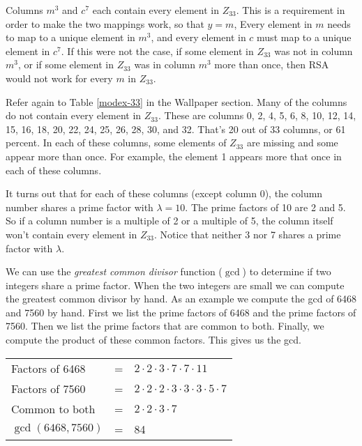 Columns $m^3$ and $c^7$ each contain every element in $Z_{33}$.
This is a requirement in order to make the two mappings work, so that $y=m$,
Every element in $m$ needs to map to a unique element in $m^3$,
and every element in $c$ must map to a unique element in $c^7$.
If this were not the case,
if some element in $Z_{33}$ was not in column $m^3$,
or if some element in $Z_{33}$ was in column $m^3$ more than once,
then RSA would not work for every $m$ in $Z_{33}$.

Refer again to Table \ref{modex-33} in the Wallpaper section.
Many of the columns do not contain every element in $Z_{33}$.
These are columns 0, 2, 4, 5, 6, 8, 10, 12, 14, 15, 16, 18, 20, 22, 24, 25, 26, 28, 30, and 32.
That's 20 out of 33 columns, or 61 percent.
In each of these columns, some elements of $Z_{33}$ are missing and some appear more than once.
For example, the element 1 appears more that once in each of these columns.

It turns out that for each of these columns (except column 0),
the column number shares a prime factor with $\lambda=10$.
The prime factors of 10 are 2 and 5.
So if a column number is a multiple of 2 or a multiple of 5,
the column itself won't contain every element in $Z_{33}$.
Notice that neither 3 nor 7 shares a prime factor with $\lambda$.

We can use the \emph{greatest common divisor} function ($\gcd$)
to determine if two integers share a prime factor.
When the two integers are small we can compute the greatest common divisor by hand.
As an example we compute the gcd of 6468 and 7560 by hand.
First we list the prime factors of 6468 and the prime factors of 7560.
Then we list the prime factors that are common to both.
Finally, we compute the product of these common factors.
This gives us the gcd.
\begin{center}
\begin{tabular}{lcl}
  Factors of 6468   &=&  $2 \cdot 2 \cdot 3 \cdot 7 \cdot 7 \cdot 11$ \\
  Factors of 7560   &=&  $2 \cdot 2 \cdot 2 \cdot 3 \cdot 3 \cdot 3 \cdot 5 \cdot 7$ \\
  Common to both    &=&  $2 \cdot 2 \cdot 3 \cdot 7$ \\
  $\gcd(6468,7560)$ &=&  84
\end{tabular}
\end{center}

